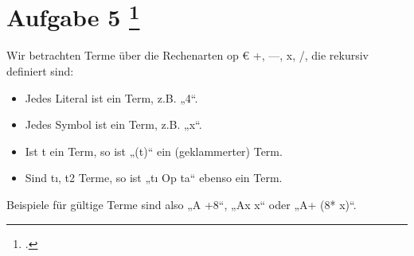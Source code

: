\documentclass{lehramt-informatik-aufgabe}
\begin{document}
\section{Aufgabe 5
\footcite{66116:2020:09}}

Wir betrachten Terme über die Rechenarten op € {+, —, x, /}, die rekursiv definiert sind:

\begin{itemize}
\item Jedes Literal ist ein Term, z.B. „4“.
\item Jedes Symbol ist ein Term, z.B. „x“.
\item Ist t ein Term, so ist „(t)“ ein (geklammerter) Term.
\item Sind tı, t2 Terme, so ist „tı Op ta“ ebenso ein Term.

\end{itemize}
Beispiele für gültige Terme sind also „A +8“, „Ax x“ oder „A+ (8* x)“.
\end{document}
